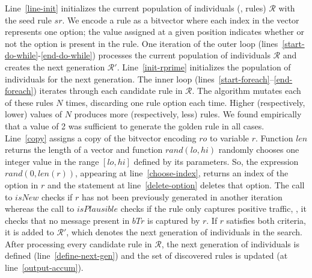 \documentclass[conference]{IEEEtran}
\begin{document}
Line~\ref{line-init} initializes the current population of individuals
(\ie{}, rules) $\mathcal{R}$ with the seed rule $sr$. We encode a rule
as a bitvector where each index in the vector represents one option;
the value assigned at a given position indicates whether or not the
option is present in the rule. One iteration of the outer loop
(lines~\ref{start-do-while}-\ref{end-do-while}) processes the current
population of individuals $\mathcal R$ and creates the next generation
$\mathcal R'$. Line~\ref{init-rprime} initializes the population of
individuals for the next generation. The inner loop
(lines~\ref{start-foreach}--\ref{end-foreach}) iterates through each
candidate rule in $\mathcal R$. The algorithm mutates each of these
rules $N$ times, discarding one rule option each
time. Higher (respectively, lower) values of $N$ produces more (respectively,
less) rules. We found empirically that a value of 2 was sufficient to
generate the golden rule in all cases. Line~\ref{copy} assigns a copy of the bitvector encoding
$\mathit{ro}$ to variable $r$. Function $\mathit{len}$ returns the
length of a vector and function $\mathit{rand(lo, hi)}$ randomly
chooses one integer value in the range $[lo, hi]$ defined by its
parameters. So, the expression $\mathit{rand(0, len(r))}$, appearing
at line~\ref{choose-index}, returns an index of the option in $r$ and
the statement at line~\ref{delete-option} deletes that option. The
call to $\mathit{isNew}$ checks if $r$ has not been previously
generated in another iteration whereas the call to
$\mathit{isPlausible}$ checks if the rule only captures positive
traffic, \ie{}, it checks that no message present in $\mathit{bTr}$ is
captured by $r$. If $r$ satisfies both criteria, it is added to
$\mathcal R'$, which denotes the next generation of individuals in the
search. After processing every candidate rule in $\mathcal R$, the
next generation of individuals is defined (line~\ref{define-next-gen})
and the set of discovered rules is updated (at
line~\ref{output-accum}).

\end{document}
